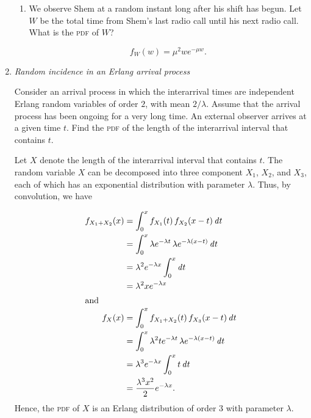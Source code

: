 \begin{enumerate}
\begin{enumerate}
  \item We observe Shem at a random instant long after his shift has begun.
    Let \(W\) be the total time from Shem’s last radio call until his next
    radio call.  What is the \textsc{pdf} of \(W\)?

    \[f_W(w) = \mu^2 w e^{-\mu w} .\]
  \end{enumerate}

\item \emph{Random incidence in an Erlang arrival process}

  Consider an arrival process in which the interarrival times are
  independent Erlang random variables of order \(2\), with mean
  \(2/λ\).  Assume that the arrival process has been ongoing for a
  very long time.  An external observer arrives at a given time \(t\).
  Find the \textsc{pdf} of the length of the interarrival interval
  that contains \(t\).

  Let \(X\) denote the length of the interarrival interval that
  contains \(t\).  The random variable \(X\) can be decomposed into three
  component \(X_1\), \(X_2\), and \(X_3\), each of which has an exponential distribution with
  parameter \(\lambda\).  Thus, by convolution, we have

  \begin{align*}
    f_{X_1+X_2}(x)
    &= \int_0^x f_{X_1}(t) \, f_{X_2}(x - t) \mathop{}\!\mathit{d} t \\
    &= \int_0^x \lambda e^{-\lambda t} \, \lambda e^{-\lambda(x - t)} \mathop{}\!\mathit{d} t \\
    &= \lambda^2 e^{-\lambda x} \int_0^x \mathop{}\!\mathit{d} t \\
    &= \lambda^2 x e^{-\lambda x} \\
    \intertext{and}
    f_{X}(x)
    &= \int_0^x f_{X_1+X_2}(t) \, f_{X_3}(x - t) \mathop{}\!\mathit{d} t \\
    &= \int_0^x \lambda^2 t e^{-\lambda t} \, \lambda e^{-\lambda(x - t)} \mathop{}\!\mathit{d} t \\
    &= \lambda^3 e^{-\lambda x} \int_0^x t \mathop{}\!\mathit{d} t \\
    &= \frac{\lambda^3 x^2}{2} e^{-\lambda x}.
  \end{align*}
  Hence, the \textsc{pdf} of \(X\) is an Erlang distribution of order \(3\) with parameter \(\lambda\).
\end{enumerate}

